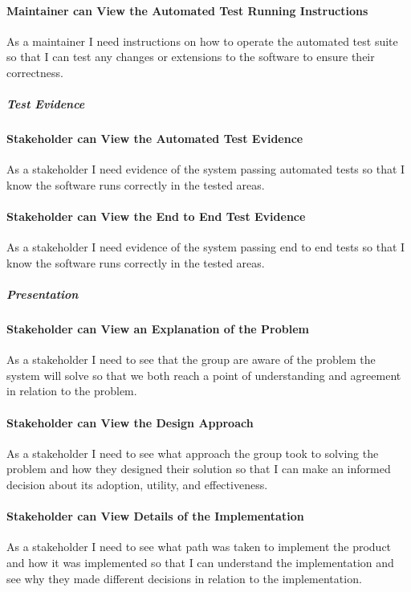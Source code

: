 \paragraph{Maintainer can View the Automated Test Running Instructions}
As a maintainer I need instructions on how to operate the automated test suite so that I can test any changes or extensions to the software to ensure their correctness.

\subparagraph{Test Evidence}

\paragraph{Stakeholder can View the Automated Test Evidence}
As a stakeholder I need evidence of the system passing automated tests so that I know the software runs correctly in the tested areas.

\paragraph{Stakeholder can View the End to End Test Evidence}
As a stakeholder I need evidence of the system passing end to end tests so that I know the software runs correctly in the tested areas.

\subparagraph{Presentation}

\paragraph{Stakeholder can View an Explanation of the Problem}
As a stakeholder I need to see that the group are aware of the problem the system will solve so that we both reach a point of understanding and agreement in relation to the problem.

\paragraph{Stakeholder can View the Design Approach}
As a stakeholder I need to see what approach the group took to solving the problem and how they designed their solution so that I can make an informed decision about its adoption, utility, and effectiveness.

\paragraph{Stakeholder can View Details of the Implementation}
As a stakeholder I need to see what path was taken to implement the product and how it was implemented so that I can understand the implementation and see why they made different decisions in relation to the implementation.

